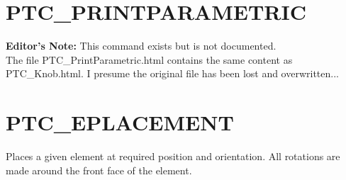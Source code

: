 
% 
% 


\section{PTC\_PRINTPARAMETRIC}
\label{sec:ptc-printparametric}

\textbf{Editor's Note:} This command exists but is not documented.\\
The file PTC\_PrintParametric.html contains the same content as
PTC\_Knob.html.
I presume the original file has been lost and overwritten...


\section{PTC\_EPLACEMENT}
\label{sec:ptc-eplacement}

Places a given element at required position and orientation.  All
rotations are made around the front face of the element.




